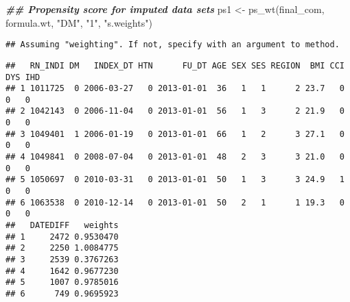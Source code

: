 \documentclass[
]{book}
\newenvironment{Shaded}{\begin{snugshade}}{\end{snugshade}}
\newcommand{\AttributeTok}[1]{\textcolor[rgb]{0.77,0.63,0.00}{#1}}
\newcommand{\ConstantTok}[1]{\textcolor[rgb]{0.00,0.00,0.00}{#1}}
\newcommand{\DocumentationTok}[1]{\textcolor[rgb]{0.56,0.35,0.01}{\textbf{\textit{#1}}}}
\newcommand{\FunctionTok}[1]{\textcolor[rgb]{0.00,0.00,0.00}{#1}}
\newcommand{\NormalTok}[1]{#1}
\newcommand{\OtherTok}[1]{\textcolor[rgb]{0.56,0.35,0.01}{#1}}
\newcommand{\SpecialCharTok}[1]{\textcolor[rgb]{0.00,0.00,0.00}{#1}}
\newcommand{\StringTok}[1]{\textcolor[rgb]{0.31,0.60,0.02}{#1}}
\theoremstyle{definition}
\theoremstyle{definition}
\theoremstyle{definition}
\theoremstyle{definition}
\theoremstyle{remark}
\begin{document}
\begin{Shaded}
\end{Shaded}

\begin{Shaded}
\begin{Highlighting}[]
\DocumentationTok{\#\# Propensity score for imputed data sets}
\NormalTok{ps1 }\OtherTok{\textless{}{-}} \FunctionTok{ps\_wt}\NormalTok{(final\_com, formula.wt, }\StringTok{"DM"}\NormalTok{, }\StringTok{"1"}\NormalTok{, }\StringTok{"s.weights"}\NormalTok{)}
\end{Highlighting}
\end{Shaded}

\begin{verbatim}
## Assuming "weighting". If not, specify with an argument to method.
\end{verbatim}

\begin{Shaded}
\end{Shaded}

\begin{verbatim}
##   RN_INDI DM   INDEX_DT HTN      FU_DT AGE SEX SES REGION  BMI CCI DYS IHD
## 1 1011725  0 2006-03-27   0 2013-01-01  36   1   1      2 23.7   0   0   0
## 2 1042143  0 2006-11-04   0 2013-01-01  56   1   3      2 21.9   0   0   0
## 3 1049401  1 2006-01-19   0 2013-01-01  66   1   2      3 27.1   0   0   0
## 4 1049841  0 2008-07-04   0 2013-01-01  48   2   3      3 21.0   0   0   0
## 5 1050697  0 2010-03-31   0 2013-01-01  50   1   3      3 24.9   1   0   0
## 6 1063538  0 2010-12-14   0 2013-01-01  50   2   1      1 19.3   0   0   0
##   DATEDIFF   weights
## 1     2472 0.9530470
## 2     2250 1.0084775
## 3     2539 0.3767263
## 4     1642 0.9677230
## 5     1007 0.9785016
## 6      749 0.9695923
\end{verbatim}
\end{document}
